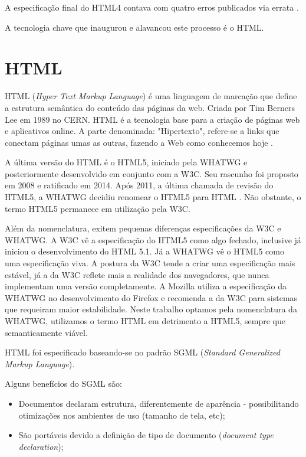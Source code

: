 \documentclass[
12pt,
a4paper,
portuges,
draft
]{report}
\begin{document}
A especificação final do HTML4 contava com quatro erros publicados via errata \autocite{HTML5}.

A tecnologia chave que inaugurou e alavancou este processo é o HTML.
\section{HTML}

HTML (\textit{Hyper Text Markup Language}) é uma linguagem de
marcação que define a estrutura semântica do conteúdo das páginas
da web. Criada por Tim Berners Lee em 1989 no CERN. HTML é a tecnologia
base para a criação de páginas web e aplicativos online. A parte
denominada: "Hipertexto", refere-se a links que conectam páginas umas
as outras, fazendo a Web como conhecemos hoje
\autocite{mdn2015}.

A última versão do HTML é o HTML5, iniciado pela WHATWG
e posteriormente desenvolvido em conjunto com a W3C.
Seu rascunho foi proposto em 2008 e ratificado em 2014.
Após 2011, a última chamada de revisão do HTML5,
a WHATWG decidiu renomear o HTML5 para HTML
\autocite{htmlIsTheNewHtml5}. Não obstante, o termo HTML5
permanece em utilização pela W3C.

Além da nomenclatura, exitem pequenas diferenças especificações da W3C e WHATWG. A
W3C vê a especificação do HTML5 como algo fechado, inclusive já
iniciou o desenvolvimento do HTML 5.1. Já a WHATWG vê o HTML5 como uma
especificação viva. A postura da W3C tende a criar uma especificação
mais estável, já a da W3C reflete mais a realidade dos navegadores,
que nunca implementam uma versão completamente. A Mozilla utiliza a
especificação da WHATWG no desenvolvimento do Firefox e recomenda a
da W3C para sistemas que requeiram maior estabilidade. Neste trabalho
optamos pela nomenclatura da WHATWG, utilizamos o termo HTML em
detrimento a HTML5, sempre que semanticamente viável.

HTML foi especificado baseando-se no padrão SGML (\textit{Standard Generalized
Markup Language}).

Alguns benefícios do SGML são:
\begin{itemize}
    \item Documentos declaram estrutura, diferentemente de aparência
- possibilitando otimizações nos ambientes de uso (tamanho de tela,
etc);
    \item São portáveis devido a definição de tipo de documento
(\textit{document type declaration});
\end{itemize}
\end{document}
